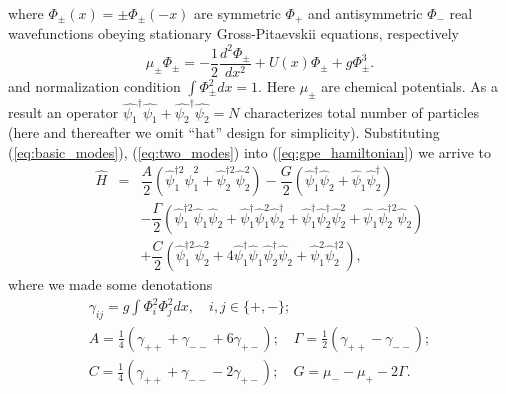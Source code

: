 \documentclass[aps, pre, preprint, groupedaddress, superscriptaddress, showkeys, showpacs] {revtex4-1}
\begin{document}
%
where $\Phi_{\pm}(x) = \pm \Phi_{\pm}(-x)$ are symmetric $\Phi_+$ and antisymmetric $\Phi_-$ real wavefunctions obeying stationary Gross-Pitaevskii equations, respectively
%
\begin{equation}
\mu_{\pm} \Phi_{\pm} = -\dfrac{1}{2} \dfrac{d^2 \Phi_{\pm}}{dx^2} + U(x) \Phi_{\pm} + g \Phi_{\pm}^3.
\label{eq:stationary}
\end{equation}
%
and normalization condition $\int \Phi_{\pm}^2 dx = 1$.
Here $\mu_{\pm}$ are chemical potentials.
As a result an operator $\hat{\psi_1}^\dag\hat{\psi_1} + \hat{\psi_2}^\dag\hat{\psi_2} = N$ characterizes total number of particles (here and thereafter we omit ``hat'' design for simplicity).
Substituting (\ref{eq:basic_modes}), (\ref{eq:two_modes}) into (\ref{eq:gpe_hamiltonian}) we arrive to
% 
\begin{equation}
\begin{array}{lcl}
\hat{H} & = & \dfrac{A}{2} (\hat{\psi}_1^{\dag 2} \hat{\psi}_1^2 + \hat{\psi}_2^{\dag 2} \hat{\psi}_2^2) - \dfrac{G}{2} (\hat{\psi}_1^\dag \hat{\psi}_2 + \hat{\psi}_1 \hat{\psi}_2^\dag) \\ [8pt]
& & -\dfrac{\Gamma}{2} (\hat{\psi}_1^{\dag 2} \hat{\psi}_1 \hat{\psi}_2 + \hat{\psi}_1^\dag \hat{\psi}_1^2 \hat{\psi}_2^\dag + \hat{\psi}_1^\dag \hat{\psi}_2^\dag \hat{\psi}_2^2 + \hat{\psi}_1 \hat{\psi}_2^{\dag 2} \hat{\psi}_2) \\ [8pt]
& & +\dfrac{C}{2} (\hat{\psi}_1^{\dag 2} \hat{\psi}_2^2 + 4 \hat{\psi}_1^\dag \hat{\psi}_1 \hat{\psi}_2^\dag \hat{\psi}_2 + \hat{\psi}_1^2 \hat{\psi}_2^{\dag 2}),
\end{array}
\label{eq:hamiltonian}
\end{equation}
%
where we made some denotations
%
\begin{equation}
\begin{array}{l}
\gamma_{ij} = g \int \Phi_i^2 \Phi_j^2 dx, \quad i,j \in \{+,-\}; \\
A = \frac{1}{4} (\gamma_{++} + \gamma_{--} + 6 \gamma_{+-}); \quad \Gamma = \frac{1}{2} (\gamma_{++} - \gamma_{--}); \\
C = \frac{1}{4} (\gamma_{++} + \gamma_{--} - 2\gamma_{+-}); \quad G = \mu_- - \mu_+ - 2\Gamma.
\end{array}
\label{eq:subs}
\end{equation}
%
\end{document}
